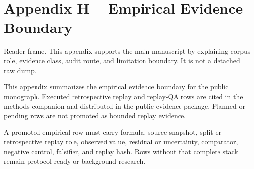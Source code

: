 \section{Appendix H -- Empirical Evidence Boundary}
Reader frame. This appendix supports the main manuscript by explaining corpus role, evidence class, audit route, and limitation boundary. It is not a detached raw dump.


\label{sec:oc-core-1-3-empirical-evidence-boundary-appendix}

This appendix summarizes the empirical evidence boundary for the public monograph. Executed retrospective replay and replay-QA rows are cited in the methods companion and distributed in the public evidence package. Planned or pending rows are not promoted as bounded replay evidence.


A promoted empirical row must carry formula, source snapshot, split or retrospective replay role, observed value, residual or uncertainty, comparator, negative control, falsifier, and replay hash. Rows without that complete stack remain protocol-ready or background research.
